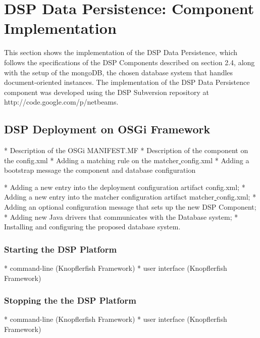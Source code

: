 

\chapter{DSP Data Persistence: Component Implementation}

This section shows the implementation of the DSP Data Persistence, which
follows the specifications of the DSP Components described on section 2.4,
along with the setup of the mongoDB, the chosen database system that handles
document-oriented instances. The implementation of the DSP Data Persistence
component was developed using the DSP Subversion repository at
http://code.google.com/p/netbeams.

\section{DSP Deployment on OSGi Framework}

    * Description of the OSGi MANIFEST.MF
    * Description of the component on the config.xml
    * Adding a matching rule on the matcher\underline{ }config.xml
    * Adding a bootstrap message the component and database configuration


    * Adding a new entry into the deployment configuration artifact config.xml;
    * Adding a new entry into the matcher configuration artifact matcher\underline{ }config.xml;
    * Adding an optional configuration message that sets up the new DSP Component;
    * Adding new Java drivers that communicates with the Database system;
    * Installing and configuring the proposed database system.

\subsection{Starting the DSP Platform}

    * command-line (Knopflerfish Framework)
    * user interface (Knopflerfish Framework)

\subsection{Stopping the the DSP Platform}

    * command-line (Knopflerfish Framework)
    * user interface (Knopflerfish Framework)


